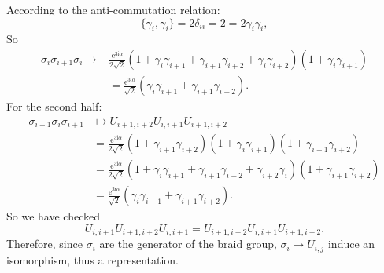 \documentclass{book}
\begin{document}
According to the anti-commutation relation:
\begin{equation*}
\{\gamma _{i} ,\gamma _{i}\} =2\delta _{ii} =2=2\gamma _{i} \gamma _{i} ,
\end{equation*}
So
\begin{equation*}
\begin{aligned}
\sigma _{i} \sigma _{i+1} \sigma _{i} \mapsto  & \frac{\mathrm{e}^{3\mathrm{i} \alpha }}{2\sqrt{2}}( 1+\gamma _{i} \gamma _{i+1} +\gamma _{i+1} \gamma _{i+2} +\gamma _{i} \gamma _{i+2})( 1+\gamma _{i} \gamma _{i+1})\\
 & =\frac{\mathrm{e}^{3\mathrm{i} \alpha }}{\sqrt{2}}( \gamma _{i} \gamma _{i+1} +\gamma _{i+1} \gamma _{i+2}) .
\end{aligned}
\end{equation*}
For the second half:
\begin{equation*}
\begin{aligned}
\sigma _{i+1} \sigma _{i} \sigma _{i+1} & \mapsto U_{i+1,i+2} U_{i,i+1} U_{i+1,i+2}\\
 & =\frac{\mathrm{e}^{3\mathrm{i} \alpha }}{2\sqrt{2}}( 1+\gamma _{i+1} \gamma _{i+2})( 1+\gamma _{i} \gamma _{i+1})( 1+\gamma _{i+1} \gamma _{i+2})\\
 & =\frac{\mathrm{e}^{3\mathrm{i} \alpha }}{2\sqrt{2}}( 1+\gamma _{i} \gamma _{i+1} +\gamma _{i+1} \gamma _{i+2} +\gamma _{i+2} \gamma _{i})( 1+\gamma _{i+1} \gamma _{i+2})\\
 & =\frac{\mathrm{e}^{3\mathrm{i} \alpha }}{\sqrt{2}}( \gamma _{i} \gamma _{i+1} +\gamma _{i+1} \gamma _{i+2}) .
\end{aligned}
\end{equation*}
So we have checked
\begin{equation*}
U_{i,i+1} U_{i+1,i+2} U_{i,i+1} =U_{i+1,i+2} U_{i,i+1} U_{i+1,i+2} .
\end{equation*}
Therefore, since $\sigma _{i}$ are the generator of the braid group, $\sigma _{i} \mapsto U_{i,j}$ induce an isomorphism, thus a representation. 
\end{document}
